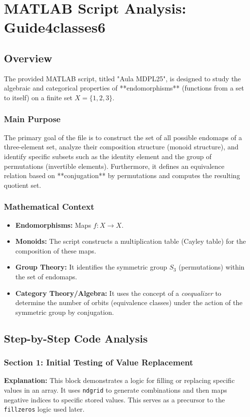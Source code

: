 \chapter{MATLAB Script Analysis: Guide4classes6}

\section{Overview}
The provided MATLAB script, titled "Aula MDPL25", is designed to study the algebraic and categorical properties of **endomorphisms** (functions from a set to itself) on a finite set $X = \{1, 2, 3\}$. 

\subsection{Main Purpose}
The primary goal of the file is to construct the set of all possible endomaps of a three-element set, analyze their composition structure (monoid structure), and identify specific subsets such as the identity element and the group of permutations (invertible elements). Furthermore, it defines an equivalence relation based on **conjugation** by permutations and computes the resulting quotient set.

\subsection{Mathematical Context}
\begin{itemize}
    \item \textbf{Endomorphisms:} Maps $f: X \to X$.
    \item \textbf{Monoids:} The script constructs a multiplication table (Cayley table) for the composition of these maps.
    \item \textbf{Group Theory:} It identifies the symmetric group $S_3$ (permutations) within the set of endomaps.
    \item \textbf{Category Theory/Algebra:} It uses the concept of a \textit{coequalizer} to determine the number of orbits (equivalence classes) under the action of the symmetric group by conjugation.
\end{itemize}

\section{Step-by-Step Code Analysis}

\subsection{Section 1: Initial Testing of Value Replacement}
\textbf{Explanation:} This block demonstrates a logic for filling or replacing specific values in an array. It uses \texttt{ndgrid} to generate combinations and then maps negative indices to specific stored values. This serves as a precursor to the \texttt{fillzeros} logic used later.

